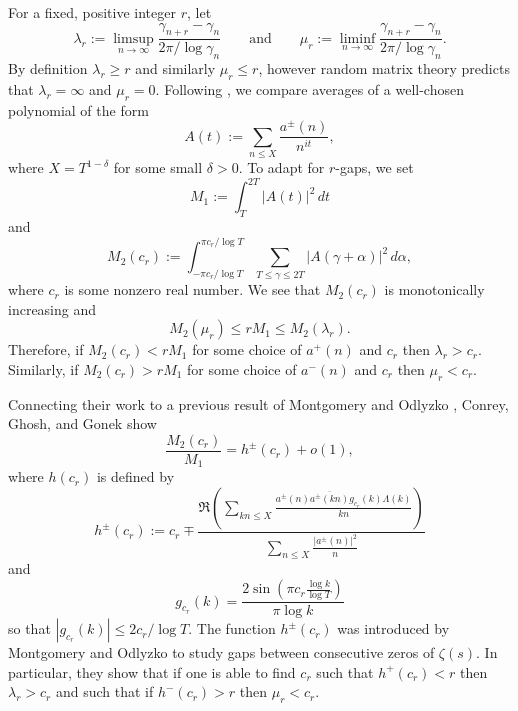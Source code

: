 \documentclass[oneside]{amsart}
\begin{document}
For a fixed, positive integer $r$, let
\begin{equation}\label{mulambda}
\lambda_r := \limsup_{n\to \infty} \frac{\gamma_{n+r}-\gamma_n}{2\pi  /\log \gamma_n} \qquad \text{and} \qquad \mu_r := \liminf_{n\to \infty} \frac{\gamma_{n+r}-\gamma_n}{2\pi /\log \gamma_n}.
\end{equation}
By definition $\lambda_r \ge r$ and similarly $\mu_r \le r$, however random matrix theory predicts that $\lambda_r = \infty$ and $\mu_r =0$.  Following \cite{CGG84}, we compare averages of a well-chosen polynomial of the form
\begin{equation}\label{polynomial}
A(t) := \sum_{n\le X}\frac{a^\pm(n)}{n^{it}},
\end{equation}
where $X=T^{1-\delta}$ for some small $\delta>0$. To adapt for $r$-gaps, we set
\begin{equation*}
M_1 := \int_{T}^{2T}\left|A(t)\right|^2\,dt
\end{equation*}
and
\begin{equation*}
M_{2}(c_r) := \int_{-\pi c_r/\log T}^{\pi c_r/\log T}\sum_{T\le \gamma \le 2T}\left|A(\gamma+\alpha)\right|^2\,d\alpha,
\end{equation*}
where $c_r$ is some nonzero real number. We see that $M_{2}(c_r)$ is monotonically increasing and
\[
M_{2}(\mu_r) \le rM_1 \le M_{2}(\lambda_r).
\]
Therefore, if $M_{2}(c_r)<rM_1$ for some choice of $a^+(n)$ and $c_r$ then $\lambda_r > c_r$. Similarly, if $M_2(c_r)>rM_1$ for some choice of $a^-(n)$ and $c_r$ then $\mu_r < c_r$. 

Connecting their work to a previous result of Montgomery and Odlyzko \cite{MO}, Conrey, Ghosh, and Gonek show 
\begin{equation*}
\frac{M_{2}(c_r)}{M_1} = h^\pm(c_r) + o(1),
\end{equation*}
where $h(c_r)$ is defined by
\begin{equation}\label{hfunction}
h^{\pm}(c_r):=c_r\mp\frac{\Re\left( \displaystyle\sum_{kn\le X}\frac{a^\pm(n)\overline{a^\pm(kn)}g_{c_r}(k)\Lambda(k)}{kn}\right)}{\displaystyle\sum_{n\le X}\frac{|a^\pm(n)|^2}{n}}
\end{equation}
and
\begin{equation*}
g_{c_r}(k)=\frac{2\sin\left(\pi c_r\frac{\log k}{\log{T}}\right)}{\pi\log k}
\end{equation*}
so that $|g_{c_r}(k)| \le 2c_r/\log T$. The function $h^\pm(c_r)$ was introduced by Montgomery and Odlyzko to study gaps between consecutive zeros of $\zeta(s)$. In particular, they show that if one is able to find $c_r$ such that $h^+(c_r) < r$ then $\lambda_r >  c_r$ and such that if $h^-(c_r) > r$ then $\mu_r < c_r$. 
\end{document}
